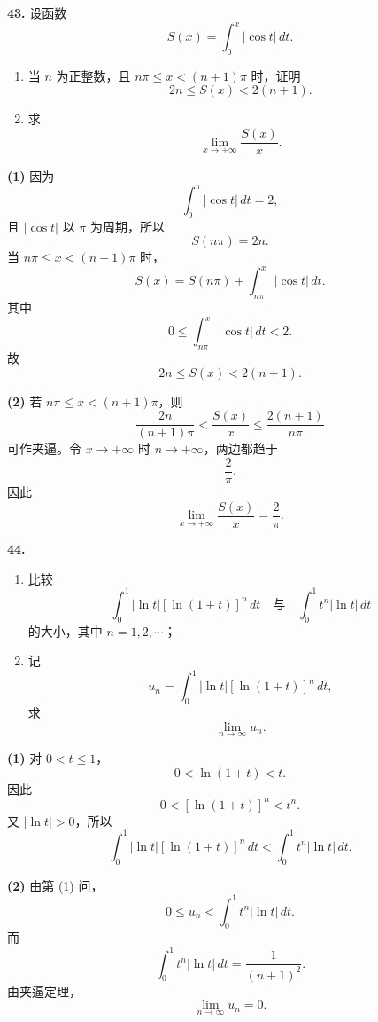 \begin{problemblock}
\textbf{43.} 设函数
\[
S(x)=\int_0^x|\cos t|\,dt.
\]
\begin{enumerate}
\item 当 \(n\) 为正整数，且 \(n\pi\le x<(n+1)\pi\) 时，证明
\[
2n\le S(x)<2(n+1).
\]
\item 求
\[
\lim_{x\to+\infty}\frac{S(x)}{x}.
\]
\end{enumerate}
\end{problemblock}

\begin{solutionblock}
\textbf{(1)} 因为
\[
\int_0^\pi|\cos t|\,dt=2,
\]
且 \(|\cos t|\) 以 \(\pi\) 为周期，所以
\[
S(n\pi)=2n.
\]
当 \(n\pi\le x<(n+1)\pi\) 时，
\[
S(x)=S(n\pi)+\int_{n\pi}^x|\cos t|\,dt.
\]
其中
\[
0\le\int_{n\pi}^x|\cos t|\,dt<2.
\]
故
\[
2n\le S(x)<2(n+1).
\]

\textbf{(2)} 若 \(n\pi\le x<(n+1)\pi\)，则
\[
\frac{2n}{(n+1)\pi}<\frac{S(x)}{x}\le\frac{2(n+1)}{n\pi}
\]
可作夹逼。令 \(x\to+\infty\) 时 \(n\to+\infty\)，两边都趋于
\[
\frac{2}{\pi}.
\]
因此
\[
\boxed{\lim_{x\to+\infty}\frac{S(x)}{x}=\frac{2}{\pi}}.
\]
\end{solutionblock}

\begin{problemblock}
\textbf{44.} 
\begin{enumerate}
\item 比较
\[
\int_0^1|\ln t|[\ln(1+t)]^n\,dt
\quad\text{与}\quad
\int_0^1t^n|\ln t|\,dt
\]
的大小，其中 \(n=1,2,\cdots\)；
\item 记
\[
u_n=\int_0^1|\ln t|[\ln(1+t)]^n\,dt,
\]
求
\[
\lim_{n\to\infty}u_n.
\]
\end{enumerate}
\end{problemblock}

\begin{solutionblock}
\textbf{(1)} 对 \(0<t\le1\)，
\[
0<\ln(1+t)<t.
\]
因此
\[
0<[\ln(1+t)]^n<t^n.
\]
又 \(|\ln t|>0\)，所以
\[
\int_0^1|\ln t|[\ln(1+t)]^n\,dt
<
\int_0^1t^n|\ln t|\,dt.
\]

\textbf{(2)} 由第 (1) 问，
\[
0\le u_n<\int_0^1t^n|\ln t|\,dt.
\]
而
\[
\int_0^1t^n|\ln t|\,dt
=\frac{1}{(n+1)^2}.
\]
由夹逼定理，
\[
\boxed{\lim_{n\to\infty}u_n=0}.
\]
\end{solutionblock}

